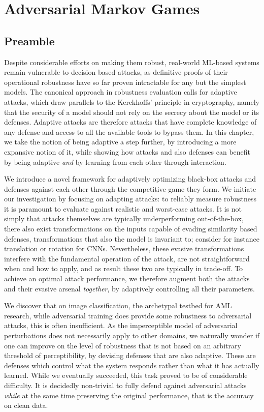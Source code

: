\chapter{Adversarial Markov Games}\label{ch:markovgames}

\section*{Preamble}

Despite considerable efforts on making them robust, real-world ML-based systems remain vulnerable to decision based attacks, as definitive proofs of their operational robustness have so far proven intractable for any but the simplest models.
The canonical approach in robustness evaluation calls for adaptive attacks, which draw parallels to the Kerckhoffs' principle in cryptography, namely that the security of a model should not rely on the secrecy about the model or its defenses. 
Adaptive attacks are therefore attacks that have complete knowledge of any defense and access to all the available tools to bypass them.
In this chapter, we take the notion of being adaptive a step further, by introducing a more expansive notion of it, while showing how attacks and also defenses can benefit by being adaptive \emph{and} by learning from each other through interaction.

We introduce a novel framework for adaptively optimizing black-box attacks and defenses against each other through the competitive game they form.
We initiate our investigation by focusing on adapting attacks: to reliably measure robustness it is paramount to evaluate against realistic and worst-case attacks.
It is not simply that attacks themselves are typically underperforming out-of-the-box, there also exist transformations on the inputs capable of evading similarity based defenses, transformations that also the model is invariant to; consider for instance translation or rotation for \gls{CNN}s.
Nevertheless, these evasive transformations interfere with the fundamental operation of the attack, are not straightforward when and how to apply, and as result these two are typically in trade-off.
To achieve an optimal attack performance, we therefore augment both the attacks and their evasive arsenal \textit{together}, by adaptively controlling all their parameters.

We discover that on image classification, the archetypal testbed for \gls{AML} research, while adversarial training does provide some robustness to adversarial attacks, this is often insufficient.
As the imperceptible model of adversarial perturbations does not necessarily apply to other domains, we naturally wonder if one can improve on the level of robustness that is not based on an arbitrary threshold of perceptibility, by devising defenses that are also adaptive.
These are defenses which control what the system responds rather than what it has actually learned.
While we eventually succeeded, this task proved to be of considerable difficulty.
It is decidedly non-trivial to fully defend against adversarial attacks \textit{while} at the same time preserving the original performance, that is the accuracy on clean data.

